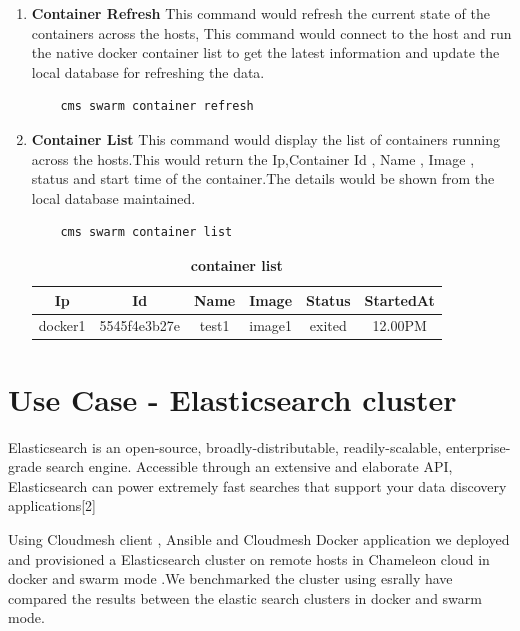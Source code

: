\documentclass[9pt,twocolumn,twoside]{../../styles/osajnl}
\begin{document}
\begin{enumerate}
    \item \textbf{Container Refresh}
    This command would refresh the current state of the containers across the hosts, This command would connect to the host and run the native docker container list to get the latest information and update the local database for refreshing the data. \\
    
    \begin{verbatim}
    cms swarm container refresh
    \end{verbatim} 

    \item \textbf{Container List}
    This command would display the list of containers running across the hosts.This would return the Ip,Container Id , Name , Image , status and start time of the container.The details would be shown from the local database maintained.
    
    \begin{verbatim}
    cms swarm container list
    \end{verbatim} 
    
     \begin{table}[htbp]
     \caption{\bf container list }
     \begin{tabular}{cccccc}
     \hline
      Ip & Id & Name & Image &Status&StartedAt\\
      \hline
      docker1 & 5545f4e3b27e & test1 & image1 &exited & 12.00PM \\
     \hline
     \end{tabular}
     \label{tab:shape-functions}
     \end{table}
\end{enumerate}

\section{Use Case - Elasticsearch cluster }
 Elasticsearch\cite{www-ElasticSearch} is an open-source, broadly-distributable, readily-scalable, enterprise-grade search engine. Accessible through an extensive and elaborate API, Elasticsearch can power extremely fast searches that support your data discovery applications[2]

 Using Cloudmesh  client , Ansible and Cloudmesh Docker application we deployed  and provisioned a Elasticsearch cluster on remote  hosts in Chameleon cloud in docker and swarm mode .We benchmarked the cluster using esrally\cite{www-ElasticSearchRally}  have compared  the  results between the elastic search clusters in docker and swarm mode.
 
\end{document}
